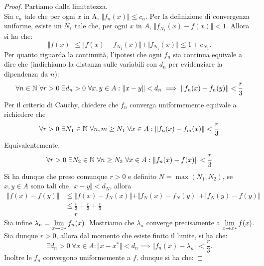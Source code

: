 \documentclass[Completo.tex]{subfiles}
\begin{document}
\begin{proof}
	Partiamo dalla limitatezza. \\
	Sia $c_n$ tale che per ogni $x$ in A, $\Vert f_n(x)\Vert \leq c_n$. Per la definizione di convergenza uniforme, esiste un $N_1$ tale che, per ogni $x$ in $A$, $\Vert f_{N_1}(x) - f(x)\Vert < 1$. Allora si ha che:
	\begin{equation*}
	\Vert f(x)\Vert \leq \Vert f(x) - f_{N_1}(x)\Vert + \Vert f_{N_1}(x)\Vert \leq 1 + c_{N_1}.
	\end{equation*}
	Per quanto riguarda la continuità, l'ipotesi che ogni $f_n$ sia continua equivale a dire che (indichiamo la distanza sulle variabili con $d_n$ per evidenziare la dipendenza da $n$):
	\begin{equation*}
	\forall n \in \bb[N] \ \forall r > 0 \ \exists d_n > 0 \ \forall x, y \in A: \Vert x - y \Vert < d_n \implies \Vert f_n(x) - f_n(y) \Vert < \frac{r}{3}
	\end{equation*}
	Per il criterio di Cauchy, chiedere che $f_n$ converga uniformemente equivale a richiedere che
	\begin{equation*}
	\forall r > 0 \ \exists N_1 \in \bb[N] \ \forall n,m \geq N_1 \ \forall x \in A: \Vert f_n(x) - f_m(x)\Vert < \frac{r}{3}
	\end{equation*}
	Equivalentemente,
	\begin{equation*}
	\forall r > 0 \ \exists N_2 \in \bb[N] \ \forall n \geq N_2 \ \forall x \in A: \Vert f_n(x) - f(x) \Vert < \frac{r}{3}
	\end{equation*}
	Si ha dunque che preso comunque $r > 0$ e definito $N = \max(N_1, N_2)$, se $x, y \in A$ sono tali che $\Vert x-y\Vert < d_{N}$, allora
	\begin{align*}
 \Vert f(x) - f(y) \Vert & \leq \Vert f(x) - f_{N}(x) \Vert + \Vert f_{N}(x) - f_{N}(y)\Vert + \Vert f_{N}(y) - f(y) \Vert \\
& \leq \frac{r}{3} + \frac{r}{3} + \frac{r}{3} \\
& = r
	\end{align*}
	Sia infine $\lambda_n = \lim\limits_{x \rightarrow x*} f_n(x)$. Mostriamo che $\lambda_n$ converge precisamente a $\lim\limits_{x \rightarrow x*} f(x)$. Sia dunque $r > 0$, allora dal momento che esiste finito il limite, si ha che:
	\begin{equation*}
	\exists d_n > 0 \ \forall x \in A: \Vert x-x^{*} \Vert < d_n \implies \Vert f_n(x) - \lambda_n \Vert < \frac{r}{3}.
	\end{equation*}
	Inoltre le $f_n$ convergono uniformemente a $f$, dunque si ha che:

\end{proof}
\end{document}
